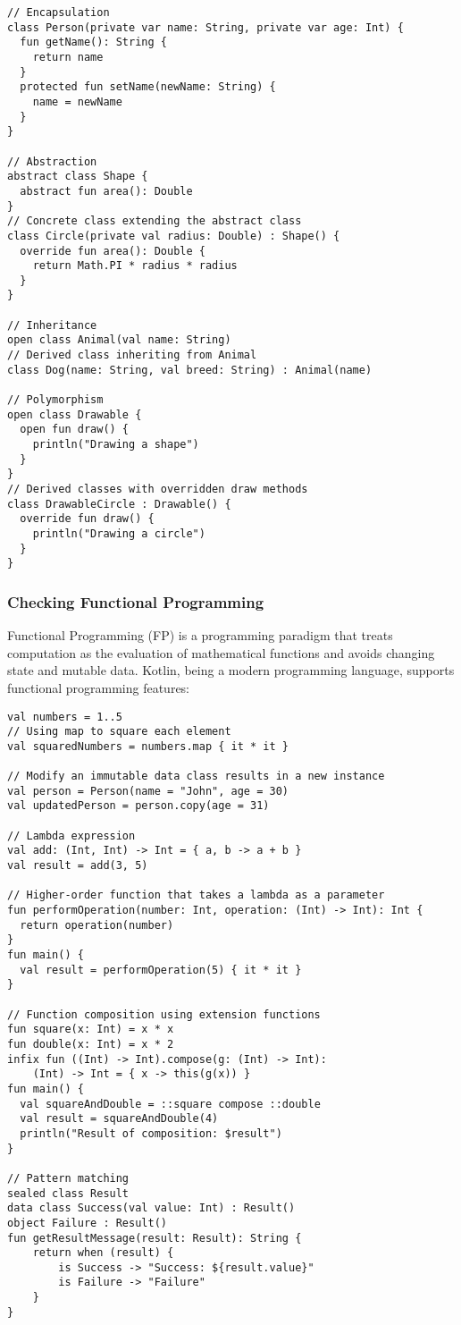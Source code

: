 \begin{lstlisting}
// Encapsulation
class Person(private var name: String, private var age: Int) {
  fun getName(): String {
    return name
  }
  protected fun setName(newName: String) {
    name = newName
  }
}

// Abstraction
abstract class Shape {
  abstract fun area(): Double
}
// Concrete class extending the abstract class
class Circle(private val radius: Double) : Shape() {
  override fun area(): Double {
    return Math.PI * radius * radius
  }
}

// Inheritance
open class Animal(val name: String)
// Derived class inheriting from Animal
class Dog(name: String, val breed: String) : Animal(name)

// Polymorphism
open class Drawable {
  open fun draw() {
    println("Drawing a shape")
  }
}
// Derived classes with overridden draw methods
class DrawableCircle : Drawable() {
  override fun draw() {
    println("Drawing a circle")
  }
}
\end{lstlisting}


\subsubsection{Checking Functional Programming}

Functional Programming (FP) is a programming paradigm that treats computation as the evaluation of mathematical 
functions and avoids changing state and mutable data. Kotlin, being a modern programming language, supports functional 
programming \cite{Carl22} features:

\begin{lstlisting}
val numbers = 1..5
// Using map to square each element
val squaredNumbers = numbers.map { it * it }

// Modify an immutable data class results in a new instance
val person = Person(name = "John", age = 30)
val updatedPerson = person.copy(age = 31)

// Lambda expression
val add: (Int, Int) -> Int = { a, b -> a + b }
val result = add(3, 5)

// Higher-order function that takes a lambda as a parameter
fun performOperation(number: Int, operation: (Int) -> Int): Int {
  return operation(number)
}
fun main() {
  val result = performOperation(5) { it * it }
}

// Function composition using extension functions
fun square(x: Int) = x * x
fun double(x: Int) = x * 2
infix fun ((Int) -> Int).compose(g: (Int) -> Int): 
    (Int) -> Int = { x -> this(g(x)) }
fun main() {
  val squareAndDouble = ::square compose ::double
  val result = squareAndDouble(4)
  println("Result of composition: $result")
}

// Pattern matching
sealed class Result
data class Success(val value: Int) : Result()
object Failure : Result()
fun getResultMessage(result: Result): String {
    return when (result) {
        is Success -> "Success: ${result.value}"
        is Failure -> "Failure"
    }
}
\end{lstlisting}


